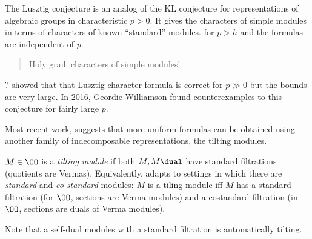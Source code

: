 The Lusztig conjecture is an analog of the KL conjecture for
representations of algebraic groups in characteristic \(p> 0\). It gives
the characters of simple modules in terms of characters of known
``standard'' modules. for \(p > h\) and the formulas are independent of
\(p\).

\begin{quote}
Holy grail: characters of simple modules!
\end{quote}

? showed that that Lusztig character formula is correct for \(p \gg 0\)
but the bounds are very large. In 2016, Geordie Williamson found
counterexamples to this conjecture for fairly large \(p\).

Most recent work, suggests that more uniform formulas can be obtained
using another family of indecomposable representations, the tilting
modules.

\begin{description}
\tightlist
\item[Definition (Tilting Modules)]
\(M\in \OO\) is a \emph{tilting module} if both \(M, M\dual\) have
standard filtrations (quotients are Vermas). Equivalently, adapts to
settings in which there are \emph{standard} and \emph{co-standard}
modules: \(M\) is a tiling module iff \(M\) has a standard filtration
(for \(\OO\), sections are Verma modules) and a costandard filtration
(in \(\OO\), sections are duals of Verma modules).
\end{description}

Note that a self-dual modules with a standard filtration is
automatically tilting.

